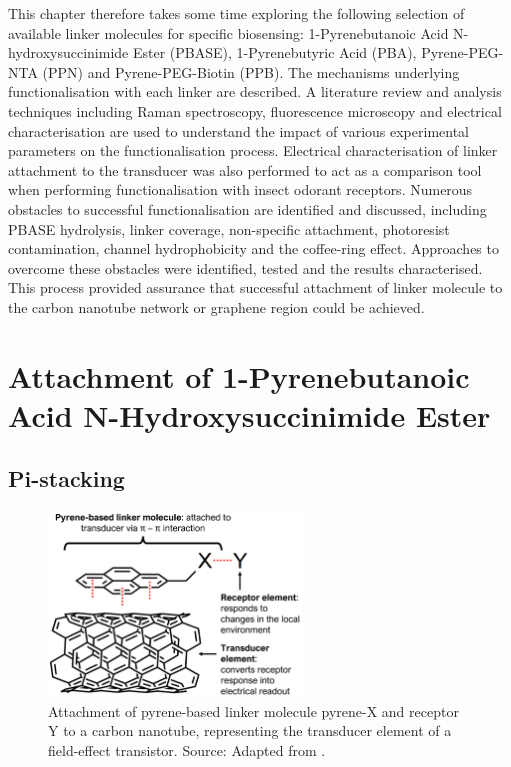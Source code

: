 \documentclass[
  a4paper,
]{scrbook}
\begin{document}
This chapter therefore takes some time exploring the following selection
of available linker molecules for specific biosensing: 1-Pyrenebutanoic
Acid N-hydroxysuccinimide Ester (PBASE), 1-Pyrenebutyric Acid (PBA),
Pyrene-PEG-NTA (PPN) and Pyrene-PEG-Biotin (PPB). The mechanisms
underlying functionalisation with each linker are described. A
literature review and analysis techniques including Raman spectroscopy,
fluorescence microscopy and electrical characterisation are used to
understand the impact of various experimental parameters on the
functionalisation process. Electrical characterisation of linker
attachment to the transducer was also performed to act as a comparison
tool when performing functionalisation with insect odorant receptors.
Numerous obstacles to successful functionalisation are identified and
discussed, including PBASE hydrolysis, linker coverage, non-specific
attachment, photoresist contamination, channel hydrophobicity and the
coffee-ring effect. Approaches to overcome these obstacles were
identified, tested and the results characterised. This process provided
assurance that successful attachment of linker molecule to the carbon
nanotube network or graphene region could be achieved.

\hypertarget{sec-PBASE}{%
\section{Attachment of 1-Pyrenebutanoic Acid N-Hydroxysuccinimide
Ester}\label{sec-PBASE}}

\hypertarget{sec-pi-stacking}{%
\subsection{Pi-stacking}\label{sec-pi-stacking}}

\begin{figure}

{\centering \includegraphics[width=0.6\textwidth,height=\textheight]{figures/ch6/pyrene-cnt.png}

}

\caption[Attachment of pyrene-based linker molecule pyrene-X and
receptor Y to a carbon nanotube, representing the transducer element of
a field-effect transistor.]{\label{fig-pi-interaction-cnt}Attachment of
pyrene-based linker molecule pyrene-X and receptor Y to a carbon
nanotube, representing the transducer element of a field-effect
transistor. Source: Adapted from \autocite{Carbonnanotube}.}

\end{figure}
\end{document}
